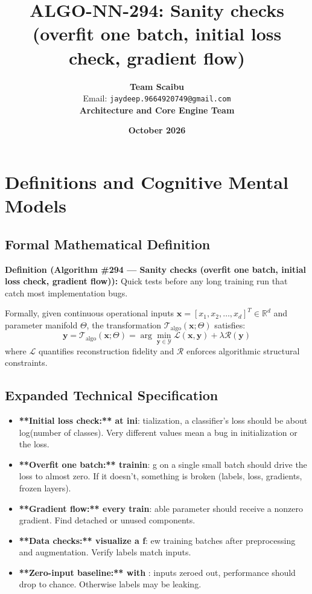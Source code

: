 \documentclass[11pt,a4paper]{article}
\title{\textbf{ALGO-NN-294: Sanity checks (overfit one batch, initial loss check, gradient flow)}}
\author{\textbf{Team Scaibu} \\ \small Email: \texttt{jaydeep.9664920749@gmail.com} \\ \small \textbf{Architecture and Core Engine Team}}
\date{\textbf{October 2026}}
\theoremstyle{definition}
\begin{document}
\maketitle

\section{Definitions and Cognitive Mental Models}

\subsection{Formal Mathematical Definition}
\textbf{Definition (Algorithm \#294 --- Sanity checks (overfit one batch, initial loss check, gradient flow)):}
Quick tests before any long training run that catch most implementation bugs.

Formally, given continuous operational inputs $\mathbf{x} = [x_1, x_2, \dots, x_d]^T \in \mathbb{R}^d$ and parameter manifold $\Theta$, the transformation $\mathcal{T}_{\text{algo}}(\mathbf{x}; \Theta)$ satisfies:
{\boldmath
\begin{equation}
\mathbf{y} = \mathcal{T}_{\text{algo}}(\mathbf{x}; \Theta) = \arg\min_{\mathbf{y} \in \mathcal{Y}} \mathcal{L}(\mathbf{x}, \mathbf{y}) + \lambda \mathcal{R}(\mathbf{y})
\end{equation}
}
where $\mathcal{L}$ quantifies reconstruction fidelity and $\mathcal{R}$ enforces algorithmic structural constraints.

\subsection{Expanded Technical Specification}
\begin{itemize}
\item \textbf{**Initial loss check:** at ini}: tialization, a classifier's loss should be about log(number of classes). Very different values mean a bug in initialization or the loss.
\item \textbf{**Overfit one batch:** trainin}: g on a single small batch should drive the loss to almost zero. If it doesn't, something is broken (labels, loss, gradients, frozen layers).
\item \textbf{**Gradient flow:** every train}: able parameter should receive a nonzero gradient. Find detached or unused components.
\item \textbf{**Data checks:** visualize a f}: ew training batches after preprocessing and augmentation. Verify labels match inputs.
\item \textbf{**Zero-input baseline:** with }: inputs zeroed out, performance should drop to chance. Otherwise labels may be leaking.
\end{itemize}
\end{document}
